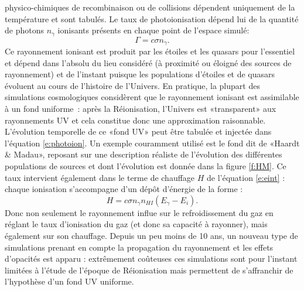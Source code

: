  physico-chimiques de recombinaison ou de collisions dépendent uniquement de la température et sont tabulés. Le taux de photoionisation dépend lui de la quantité de photons $n_\gamma$ ionisants présents en chaque point de l'espace simulé:
\begin{equation}
\Gamma=c\sigma n_\gamma.
\label{e:photoion}
\end{equation}
Ce rayonnement ionisant est produit par les étoiles et les quasars pour l'essentiel et dépend dans l'absolu du lieu considéré (à proximité ou éloigné des sources de rayonnement) et de l'instant puisque les populations d'étoiles et de quasars évoluent au cours de l'histoire de l'Univers. En pratique, la plupart des simulations cosmologiques considèrent que le rayonnement ionisant est assimilable à un fond uniforme~: après la Réionisation, l'Univers est «transparent» aux rayonnements UV et cela constitue donc une approximation raisonnable. L'évolution temporelle de ce «fond UV» peut être tabulée et injectée dans l'équation \ref{e:photoion}. Un exemple couramment utilisé est le fond dit de «Haardt \& Madau», reposant sur une description réaliste de l'évolution des différentes populations de sources et dont l'évolution est donnée dans la figure \ref{f:HM}. Ce taux intervient également dans le terme de chauffage $H$ de l'équation \ref{e:eint} : chaque ionisation s'accompagne d'un dépôt d'énergie de la forme :
\begin{equation}
H=c \sigma n_\gamma n_{HI} (E_\gamma-E_i).
\end{equation}
Donc non seulement le rayonnement influe sur le refroidissement du gaz en réglant le taux d'ionisation du gaz (et donc sa capacité à rayonner), mais également sur son chauffage. Depuis un peu moins de 10 ans, un nouveau type de simulations prenant en compte la propagation du rayonnement et les effets d'opacités  est apparu : extrêmement coûteuses ces simulations sont pour l'instant limitées à l'étude de l'époque de Réionisation mais permettent de s'affranchir de l'hypothèse d'un fond UV uniforme. 


